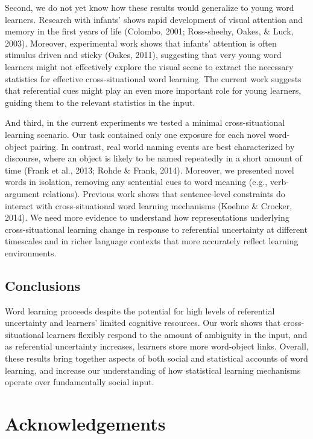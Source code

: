\documentclass[authoryear, review]{elsarticle}
\begin{document}
Second, we do not yet know how these results would generalize to young
word learners. Research with infants' shows rapid development of visual
attention and memory in the first years of life (Colombo, 2001;
Ross-sheehy, Oakes, \& Luck, 2003). Moreover, experimental work shows
that infants' attention is often stimulus driven and sticky (Oakes,
2011), suggesting that very young word learners might not effectively
explore the visual scene to extract the necessary statistics for
effective cross-situational word learning. The current work suggests
that referential cues might play an even more important role for young
learners, guiding them to the relevant statistics in the input.

And third, in the current experiments we tested a minimal
cross-situational learning scenario. Our task contained only one
exposure for each novel word-object pairing. In contrast, real world
naming events are best characterized by discourse, where an object is
likely to be named repeatedly in a short amount of time (Frank et al.,
2013; Rohde \& Frank, 2014). Moreover, we presented novel words in
isolation, removing any sentential cues to word meaning (e.g.,
verb-argument relations). Previous work shows that sentence-level
constraints do interact with cross-situational word learning mechanisms
(Koehne \& Crocker, 2014). We need more evidence to understand how
representations underlying cross-situational learning change in response
to referential uncertainty at different timescales and in richer
language contexts that more accurately reflect learning environments.

\subsection{Conclusions}\label{conclusions}

Word learning proceeds despite the potential for high levels of
referential uncertainty and learners' limited cognitive resources. Our
work shows that cross-situational learners flexibly respond to the
amount of ambiguity in the input, and as referential uncertainty
increases, learners store more word-object links. Overall, these results
bring together aspects of both social and statistical accounts of word
learning, and increase our understanding of how statistical learning
mechanisms operate over fundamentally social input.

\newpage

\section{Acknowledgements}\label{acknowledgements}
\end{document}
